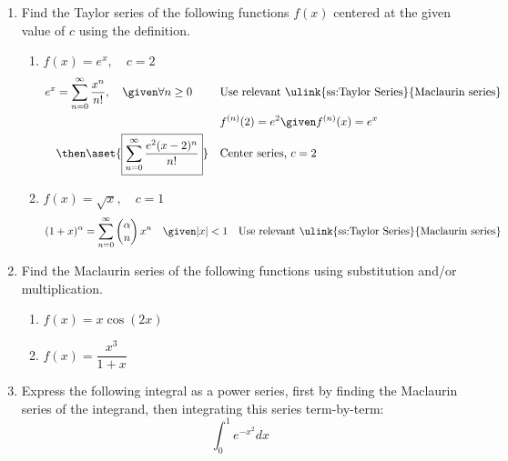 \begin{enumerate}
  \item Find the Taylor series of the following functions \(f(x)\) centered at
    the given value of \(c\) using the definition.
    \begin{enumerate}[itemsep=24em]
      \item \(f(x) = e^x, \quad c = 2\)
        \begin{align*}
          e^x &= \sum_{n=0}^{\infty} \frac{x^n}{n!}, \quad \given \forall n \geq 0
              && \text{Use relevant \ulink{ss:Taylor Series}{Maclaurin series}} \\
              & && f^{(n)}(2) = e^2 \given f^{(n)}(x) = e^x\\
                     &\then \aset{\boxed{\sum_{n=0}^{\infty} \frac{e^2(x-2)^n}{n!}}}
                     && \text{Center series, } c= 2 \\
        \end{align*}

      \vspace{-16em}
      \item \(f(x) = \sqrt{x}, \quad c = 1\)
        \begin{align*}
      (1 + x)^\alpha  &= \sum_{n=0}^{\infty} \begin{pmatrix} \alpha \\ n
      \end{pmatrix} x^n \quad \given |x| < 1
          && \text{Use relevant \ulink{ss:Taylor Series}{Maclaurin series}} \\
        \end{align*}
    \end{enumerate}

\newpage %

  \item Find the Maclaurin series of the following functions using substitution
    and/or multiplication.

    \begin{enumerate}[itemsep=24em]
      \item \(f(x) = x \cos (2x)\)

      \item \(f(x) = \dfrac{x^3}{1+x}\)
    \end{enumerate}

\newpage %

  \item Express the following integral as a power series, first by finding the
    Maclaurin series of the integrand, then integrating this series
    term-by-term:
    \[%
    \int_{0}^{1} e^{-x^2}  dx
    \]%


\end{enumerate}
